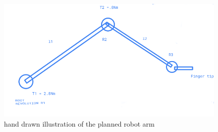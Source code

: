 \begin{figure}[H]
    \centering
    \includegraphics[width=1\linewidth]{pictures/robot_illustration.png}
    \caption{hand drawn illustration of the planned robot arm}
    \label{fig:enter-label}
\end{figure}


